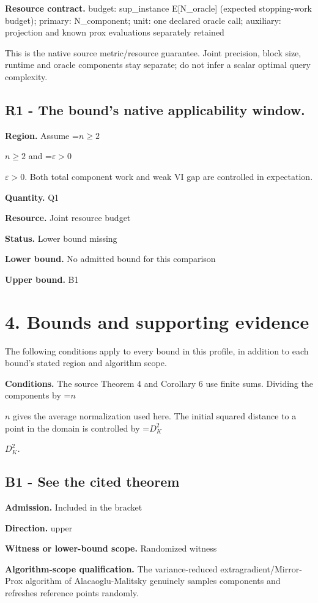 \documentclass[10pt,a4paper]{article}
\newcommand{\AtlasMath}[1]{\par\begingroup\centering\setbox0=\hbox{$\displaystyle #1$}\ifdim\wd0>1.4\linewidth\typeout{ATLAS WIDE FORMULA: \the\wd0}\fi\ifdim\wd0>\linewidth\resizebox{\linewidth}{!}{\box0}\else\box0\fi\par\endgroup}
\newcommand{\AtlasInlineMath}[1]{\begingroup\setbox0=\hbox{$#1$}\ifdim\wd0>.4\linewidth\endgroup\AtlasMath{#1}\else\endgroup$#1$\fi}
\begin{document}
\textbf{Resource contract.} budget: sup\_instance E[N\_oracle] (expected stopping-work budget); primary: N\_component; unit: one declared oracle call; auxiliary: projection and known prox evaluations separately retained

This is the native source metric/resource guarantee. Joint precision, block size, runtime and oracle components stay separate; do not infer a scalar optimal query complexity.

\subsection{R1 - The bound’s native applicability window.}
\textbf{Region.} Assume \AtlasInlineMath{n\ge2} and \AtlasInlineMath{\varepsilon>0}. Both total component work and weak VI gap are controlled in expectation.

\textbf{Quantity.} Q1

\textbf{Resource.} Joint resource budget

\textbf{Status.} Lower bound missing

\textbf{Lower bound.} No admitted bound for this comparison

\textbf{Upper bound.} B1

\section{4. Bounds and supporting evidence}
The following conditions apply to every bound in this profile, in addition to each bound's stated region and algorithm scope.

\textbf{Conditions.} The source Theorem 4 and Corollary 6 use finite sums. Dividing the components by \AtlasInlineMath{n} gives the average normalization used here. The initial squared distance to a point in the domain is controlled by \AtlasInlineMath{D_K^2}.

\subsection{B1 - See the cited theorem}
\textbf{Admission.} Included in the bracket

\textbf{Direction.} upper

\textbf{Witness or lower-bound scope.} Randomized witness

\textbf{Algorithm-scope qualification.} The variance-reduced extragradient/Mirror-Prox algorithm of Alacaoglu-Malitsky genuinely samples components and refreshes reference points randomly.
\end{document}
